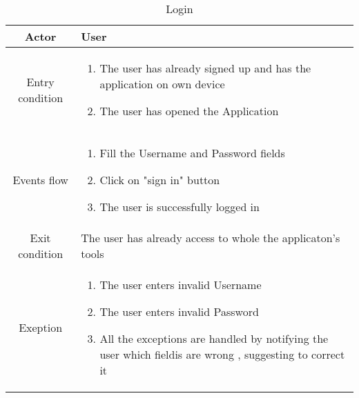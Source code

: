 \documentclass{article}
\begin{document}
		\begin{table} [H]
		\begin{center}
		\caption{Login}
		\begin{tabular}{|c|p{8cm}|}
			\hline
			Actor&User\\
			\hline
			Entry condition& \begin{enumerate}
								\item The user has already signed up and has the application on own device
								\item The user has opened the Application
							\end{enumerate}\\
			\hline
			Events flow& \begin{enumerate}
							\item Fill the Username and Password fields 
							\item Click on "sign in" button
							\item The user is successfully logged in 
			
						\end{enumerate}\\
			\hline
			Exit condition& The user has already access to whole the applicaton's tools\\
			\hline
			Exeption& \begin{enumerate}
							\item The user enters invalid Username
							\item The user enters invalid Password
							\item All the exceptions are handled by notifying the user which fieldis are wrong , suggesting to correct it
						\end{enumerate}\\
			\hline
		\end{tabular}
		\end{center}
		\end{table} 
\end{document}
